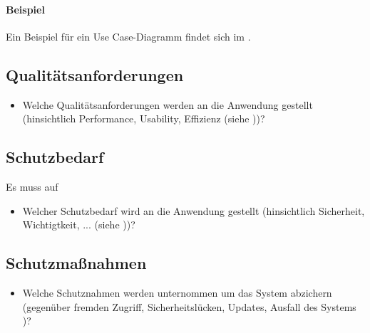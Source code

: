 \paragraph{Beispiel}
Ein Beispiel für ein Use Case-Diagramm findet sich im .


\subsection{Qualitätsanforderungen}
\label{sec:Qualitaetsanforderungen}
\begin{itemize}
	\item Welche Qualitätsanforderungen werden an die Anwendung gestellt (\zB hinsichtlich Performance, Usability, Effizienz \etc (siehe \citet{ISO9126}))?
\end{itemize}

\subsection{Schutzbedarf}
\label{sec:Schutzbedarf}
Es muss auf 
\begin{itemize}
	\item Welcher Schutzbedarf  wird an die Anwendung gestellt (\zB hinsichtlich Sicherheit, Wichtigtkeit, ... \etc (siehe \citet{BSI-S-200-2}))?
\end{itemize}

\subsection{Schutzmaßnahmen}
\label{sec:Schutzmaßnahmen}
\begin{itemize}
	\item Welche Schutznahmen werden unternommen um das System abzichern (\zB gegenüber fremden Zugriff, Sicherheitslücken, Updates, Ausfall des Systems \etc)?
\end{itemize}


